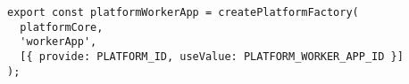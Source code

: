\begin{verbatim}
export const platformWorkerApp = createPlatformFactory(
  platformCore,
  'workerApp',
  [{ provide: PLATFORM_ID, useValue: PLATFORM_WORKER_APP_ID }]
);
\end{verbatim}
